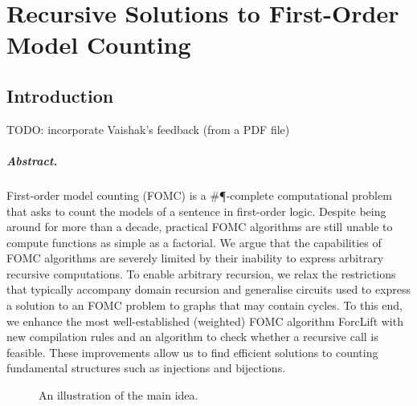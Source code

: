 \chapter{Recursive Solutions to First-Order Model Counting} \label{chapter:wfomc}

\section{Introduction}

TODO: incorporate Vaishak's feedback (from a PDF file)

\paragraph{Abstract.} First-order model counting (FOMC) is a \#\P-complete computational problem that asks to count the models of a sentence in first-order logic. Despite being around for more than a decade, practical FOMC algorithms are still unable to compute functions as simple as a factorial. We argue that the capabilities of FOMC algorithms are severely limited by their inability to express arbitrary recursive computations. To enable arbitrary recursion, we relax the restrictions that typically accompany domain recursion and generalise circuits used to express a solution to an FOMC problem to graphs that may contain cycles. To this end, we enhance the most well-established (weighted) FOMC algorithm ForcLift with new compilation rules and an algorithm to check whether a recursive call is feasible. These improvements allow us to find efficient solutions to counting fundamental structures such as injections and bijections.

\begin{figure}[t]
  \centering
  \caption{An illustration of the main idea.}
  \label{fig:idea}
\end{figure}

